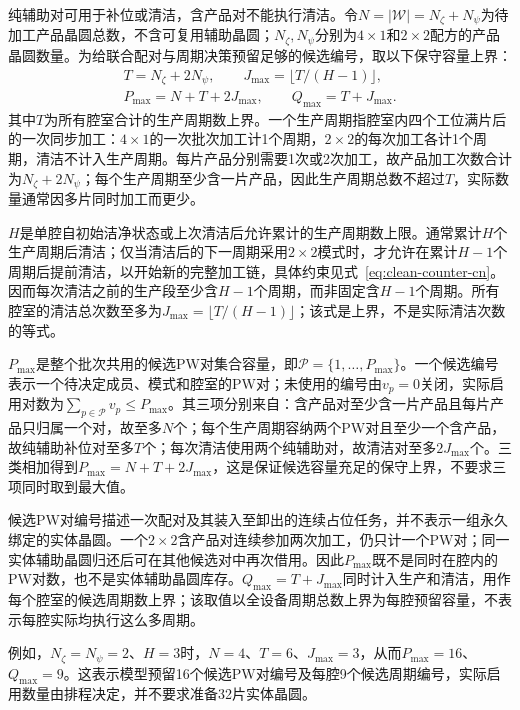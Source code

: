 \documentclass[final,5p,times,twocolumn]{elsarticle}
\begin{document}
纯辅助对可用于补位或清洁，含产品对不能执行清洁。令$N=|\mathcal W|=N_{\zeta}+N_{\psi}$为待加工产品晶圆总数，不含可复用辅助晶圆；$N_{\zeta},N_{\psi}$分别为$4\times1$和$2\times2$配方的产品晶圆数量。为给联合配对与周期决策预留足够的候选编号，取以下保守容量上界：
\begin{equation}
\begin{gathered}
T=N_{\zeta}+2N_{\psi},\qquad J_{\max}=\lfloor T/(H-1)\rfloor,\\
P_{\max}=N+T+2J_{\max},\qquad Q_{\max}=T+J_{\max}.
\end{gathered}
\label{eq:candidate-bounds-cn}
\end{equation}
其中$T$为所有腔室合计的生产周期数上界。一个生产周期指腔室内四个工位满片后的一次同步加工：$4\times1$的一次批次加工计1个周期，$2\times2$的每次加工各计1个周期，清洁不计入生产周期。每片产品分别需要1次或2次加工，故产品加工次数合计为$N_{\zeta}+2N_{\psi}$；每个生产周期至少含一片产品，因此生产周期总数不超过$T$，实际数量通常因多片同时加工而更少。

$H$是单腔自初始洁净状态或上次清洁后允许累计的生产周期数上限。通常累计$H$个生产周期后清洁；仅当清洁后的下一周期采用$2\times2$模式时，才允许在累计$H-1$个周期后提前清洁，以开始新的完整加工链，具体约束见式~\eqref{eq:clean-counter-cn}。因而每次清洁之前的生产段至少含$H-1$个周期，而非固定含$H-1$个周期。所有腔室的清洁总次数至多为$J_{\max}=\lfloor T/(H-1)\rfloor$；该式是上界，不是实际清洁次数的等式。

$P_{\max}$是整个批次共用的候选PW对集合容量，即$\mathcal P=\{1,\ldots,P_{\max}\}$。一个候选编号表示一个待决定成员、模式和腔室的PW对；未使用的编号由$v_p=0$关闭，实际启用对数为$\sum_{p\in\mathcal P}v_p\le P_{\max}$。其三项分别来自：含产品对至少含一片产品且每片产品只归属一个对，故至多$N$个；每个生产周期容纳两个PW对且至少一个含产品，故纯辅助补位对至多$T$个；每次清洁使用两个纯辅助对，故清洁对至多$2J_{\max}$个。三类相加得到$P_{\max}=N+T+2J_{\max}$，这是保证候选容量充足的保守上界，不要求三项同时取到最大值。

候选PW对编号描述一次配对及其装入至卸出的连续占位任务，并不表示一组永久绑定的实体晶圆。一个$2\times2$含产品对连续参加两次加工，仍只计一个PW对；同一实体辅助晶圆归还后可在其他候选对中再次借用。因此$P_{\max}$既不是同时在腔内的PW对数，也不是实体辅助晶圆库存。$Q_{\max}=T+J_{\max}$同时计入生产和清洁，用作每个腔室的候选周期数上界；该取值以全设备周期总数上界为每腔预留容量，不表示每腔实际均执行这么多周期。

例如，$N_{\zeta}=N_{\psi}=2$、$H=3$时，$N=4$、$T=6$、$J_{\max}=3$，从而$P_{\max}=16$、$Q_{\max}=9$。这表示模型预留16个候选PW对编号及每腔9个候选周期编号，实际启用数量由排程决定，并不要求准备32片实体晶圆。
\end{document}
